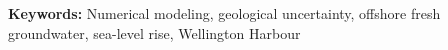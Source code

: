 \documentclass[pdflatex,sn-apa]{sn-jnl}%
\begin{document}
% 
% 
% 

\textbf{Keywords:} Numerical modeling, geological uncertainty, offshore fresh groundwater, sea-level rise, Wellington Harbour




\maketitle
\end{document}
